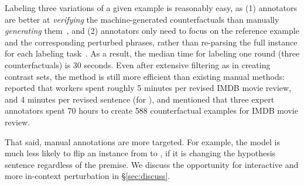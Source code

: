 
Labeling three variations of a given example is reasonably easy, as (1) annotators are better at \emph{verifying} the machine-generated counterfactuals than manually \emph{generating} them~\cite{ribeiro2018sear}, and (2) annotators only need to focus on the reference example and the corresponding perturbed phrases, rather than re-parsing the full instance for each labeling task~\cite{Khashabi2020MoreBF}.
As a result, the median time for labeling one round (three counterfactuals) is 30 seconds.
Even after extensive filtering as in creating contrast sets, the method is still more efficient than existing manual methods:
\citet{kaushik2019learning} reported that workers spent roughly 5 minutes per revised IMDB movie review, and 4 minutes per revised sentence (for \nli), and \citet{gardner2020contrast} mentioned that three expert annotators spent 70 hours to create 588 counterfactual examples for IMDB movie review.



That said, manual annotations are more targeted. 
For example, the model is much less likely to flip an \nli instance from  to , if it is changing the hypothesis sentence regardless of the premise.
We discuss the opportunity for interactive and more in-context perturbation in \S\ref{sec:discuss}.


